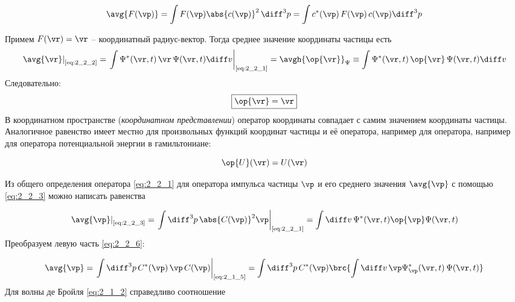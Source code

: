 \begin{equation}
\label{eq:2_2_3}
\avg{F(\vp)} = \int F(\vp) \abs{c(\vp)}^2 \, \diff^3 p = \int c^*(\vp) \, F(\vp) \, c(\vp) \diff^3 p 
\end{equation}

Примем $F(\vr) = \vr$ -- координатный радиус-вектор. Тогда среднее значение координаты частицы есть
$$
\left. \avg{\vr} \right|_{\text{\eqref{eq:2_2_2}}} = 
  \left. \int \Psi^*(\vr, t) \, \vr \, \Psi(\vr,t)\diff v \right|_{\text{\eqref{eq:2_2_1}}} =
  \avgh{\op{\vr}}_\Psi \equiv \int \Psi^*(\vr,t) \, \op{\vr} \, \Psi(\vr,t)\diff v
$$%
%
Следовательно:
\begin{equation}
\label{eq:2_2_4}
\boxed{\op{\vr} = \vr}
\end{equation}%
%
В координатном пространстве ({\em координатном представлении}) оператор координаты совпадает с самим значением координаты частицы. Аналогичное равенство имеет местно для произвольных функций координат частицы и её оператора, например для оператора, например для оператора потенциальной энергии в гамильтониане:

\begin{equation}
\label{eq:2_2_5}
\op{U}(\vr) = U(\vr)
\end{equation}

Из общего определения оператора \eqref{eq:2_2_1} для оператора импульса частицы $\vp$ и его среднего значения $\avg{\vp}$ с помощью \eqref{eq:2_2_3} можно написать равенства

\begin{equation}
\label{eq:2_2_6}
\left. \avg{\vp} \right|_{\text{\eqref{eq:2_2_3}}} = 
  \left. \int \diff^3 p \, \abs{C(\vp)}^2 \vp \right|_{\text{\eqref{eq:2_2_1}}} = 
  \int\diff v \, \Psi^*(\vr,t) \op{\vp} \Psi(\vr,t)
\end{equation}%
%
Преобразуем левую часть \eqref{eq:2_2_6}:

$$
\avg{\vp} = \left. \int \diff^3 p \, C^*(\vp) \, \vp \, C(\vp) \right|_{\text{\eqref{eq:2_1_5}}} =
  \int \diff^3 p \, C^*(\vp) \brc{ \int \diff v \, \vp \Psi_{\vp}^*(\vr,t) \, \Psi(\vr,t) }
$$%
%
Для волны де Бройля \eqref{eq:2_1_2} справедливо соотношение

